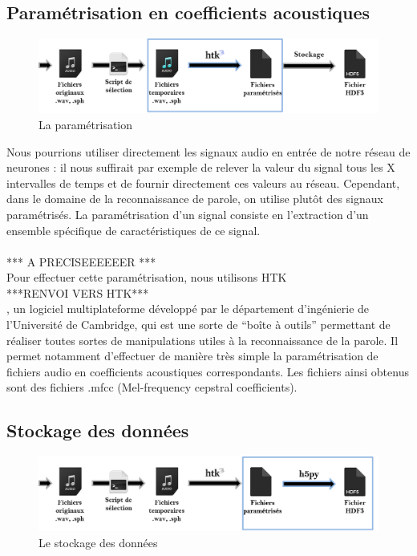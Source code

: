 \documentclass{article}
\begin{document}
\subsection{Paramétrisation en coefficients acoustiques}

\hphantom{.}
\begin{figure}[h]
  \centerline{\includegraphics[scale=0.9]{img/schema_parametrisation.png}}
  \caption{La paramétrisation}
\end{figure}
\newpage

Nous pourrions utiliser directement les signaux audio en entrée de notre réseau de neurones : il nous suffirait par exemple de relever la valeur du signal tous les X intervalles de temps et de fournir directement ces valeurs au réseau. Cependant, dans le domaine de la reconnaissance de parole, on utilise plutôt des signaux paramétrisés.
La paramétrisation d'un signal consiste en l'extraction d'un ensemble spécifique de caractéristiques de ce signal. \\
\\
*** A PRECISEEEEEER ***\\
Pour effectuer cette paramétrisation, nous utilisons HTK\\
 ***RENVOI VERS HTK***\\, un logiciel multiplateforme développé par le département d'ingénierie de l'Université de Cambridge, qui est une sorte de ``boîte à outils'' permettant de réaliser toutes sortes de manipulations utiles à la reconnaissance de la parole. Il permet notamment d'effectuer de manière très simple la paramétrisation de fichiers audio en coefficients acoustiques correspondants. Les fichiers ainsi obtenus sont des fichiers .mfcc (Mel-frequency cepstral coefficients).
 
\subsection{Stockage des données}

\hphantom{.}
\begin{figure}[h]
  \centerline{\includegraphics[scale=0.9]{img/schema_stockage.png}}
  \caption{Le stockage des données}
\end{figure}
\end{document}
